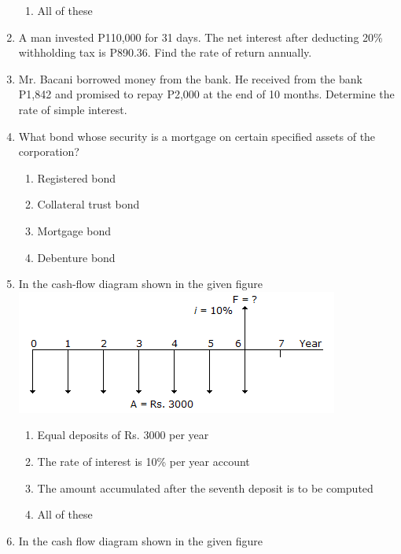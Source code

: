 \documentclass[11pt,a4paper]{article}
\begin{document}
\begin{enumerate}
\begin{enumerate}[label=\Alph*.]
\item{All of these}
\end{enumerate}
\item{A man invested P110,000 for 31 days. The net interest after deducting 20\% withholding tax is P890.36. Find the rate of return annually.}
\\
\item{Mr. Bacani borrowed money from the bank. He received from the bank P1,842 and promised to repay P2,000 at the end of 10 months. Determine the rate of simple interest.}
\\
\item{What bond whose security is a mortgage on certain specified assets of the corporation?}
\begin{enumerate}[label=\Alph*.]
\item{Registered bond}
\item{Collateral trust bond}
\item{Mortgage bond}
\item{Debenture bond}
\end{enumerate}
\item{In the cash-flow diagram shown in the given figure \\

\includegraphics{../data_img/engineering-economics-_1525417448-22.png}
}
\begin{enumerate}[label=\Alph*.]
\item{Equal deposits of Rs. 3000 per year }
\item{The rate of interest is 10\% per year account}
\item{The amount accumulated after the seventh deposit is to be computed}
\item{All of these}
\end{enumerate}
\item{In the cash flow diagram shown in the given figure \\

}
\end{enumerate}
\end{document}
